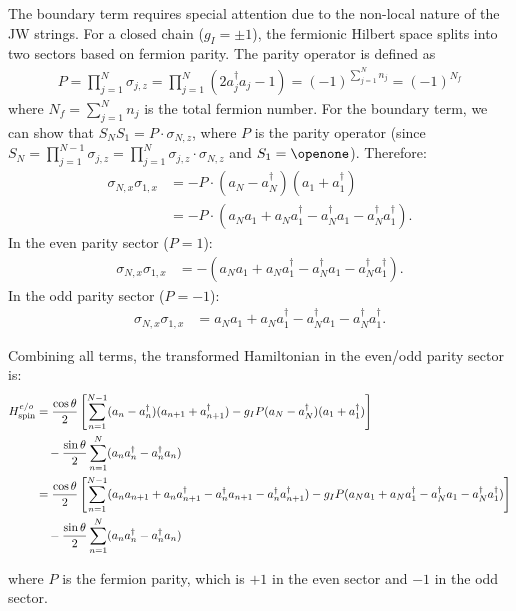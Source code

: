 \documentclass[aps,prx,twocolumn,superscriptaddress,nofootinbib,nolongbibliography,nobalancelastpage,10pt,floatfix]{revtex4-2}
\begin{document}
The boundary term requires special attention due to the non-local nature of the JW strings. For a closed chain ($g_I=\pm 1$), the fermionic Hilbert space splits into two sectors based on fermion parity. The parity operator is defined as
\begin{align}
    P = \prod_{j=1}^{N} \sigma_{j,z} = \prod_{j=1}^{N} (2a_j^\dag a_j - 1) =
    (-1)^{\sum_{j=1}^{N} n_j} = (-1)^{N_f}
\end{align}
where $N_f = \sum_{j=1}^{N} n_j$ is the total fermion number.
For the boundary term, we can show that $S_N S_1 = P \cdot \sigma_{N,z}$, where $P$ is the parity operator (since $S_N=\prod_{j=1}^{N-1} \sigma_{j,z} = \prod_{j=1}^{N} \sigma_{j,z} \cdot \sigma_{N,z}$ and $S_1=\Id$). Therefore:
\begin{align}
    \sigma_{N,x}\sigma_{1,x} &= -P \cdot (a_N - a_N^\dag)(a_1 + a_1^\dag)\\
                             &= -P \cdot (a_N a_1 + a_N a_1^\dag - a_N^\dag a_1 - a_N^\dag a_1^\dag).
\end{align}
In the even parity sector ($P = 1$):
\begin{align}
    \sigma_{N,x}\sigma_{1,x} &= -(a_N a_1 + a_N a_1^\dag - a_N^\dag a_1 - a_N^\dag a_1^\dag).
\end{align}
In the odd parity sector ($P = -1$):
\begin{align}
    \sigma_{N,x}\sigma_{1,x} &= a_N a_1 + a_N a_1^\dag - a_N^\dag a_1 - a_N^\dag a_1^\dag.
\end{align}

Combining all terms, the transformed Hamiltonian in the even/odd parity sector is:
\begin{align}
    H_{\mathrm{spin}}^{e/o} &= \frac{\cos\theta}{2} \left[\sum_{n=1}^{N-1} (a_n - a_n^\dag)(a_{n+1} + a_{n+1}^\dag)
    - g_I P (a_N - a_N^\dag)(a_1 + a_1^\dag)\right] \nonumber\\
                            &\quad - \frac{\sin\theta}{2} \sum_{n=1}^N (a_n a_n^\dag - a_n^\dag a_n)\\
                            &=\frac{\cos\theta}{2} \left[\sum_{n=1}^{N-1} (a_n a_{n+1} + a_n a_{n+1}^\dag - a_n^\dag a_{n+1} - a_n^\dag a_{n+1}^\dag)
    - g_I P (a_N a_1 + a_N a_1^\dag - a_N^\dag a_1 - a_N^\dag a_1^\dag)\right] \nonumber\\
                            &\quad - \frac{\sin\theta}{2} \sum_{n=1}^N (a_n a_n^\dag - a_n^\dag a_n)
\end{align}

where $P$ is the fermion parity, which is $+1$ in the even sector and $-1$ in the odd sector.
\end{document}
